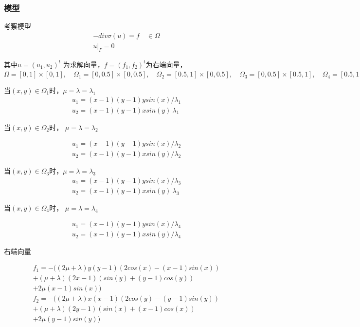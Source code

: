 \documentclass[a4paper,UTF8,titlepage]{ctexart}
\begin{document}
\subsubsection{模型}

考察模型
$$
\begin{matrix}
	-div \sigma(u) = f \quad \in \Omega  \\
	u |_{\Gamma} = 0
\end{matrix}
$$ 
\par
其中$ u = (u_1,u_2)^t $ 为求解向量，$ f = (f_1,f_2)^t $为右端向量，
$ 
\Omega = [0,1] \times [0,1] , \quad 
\Omega_1 = [0,0.5] \times [0,0.5] , \quad
\Omega_2 = [0.5,1] \times [0,0.5], \quad
\Omega_3 = [0,0.5] \times [0.5,1], \quad
\Omega_4 = [0.5,1] \times [0.5,1]
$ 
\par
当$(x,y) \in \Omega_1$时，$\mu = \lambda = \lambda_1$
$$
\begin{matrix}
	u_1 = (x - 1)(y - 1) y sin(x) / \lambda_1
	\\
	u_2 = (x - 1)(y - 1) x sin(y) \ \lambda_1
\end{matrix}
$$

当$(x,y) \in \Omega_2$时， $\mu = \lambda = \lambda_2$

$$
\begin{matrix}
	u_1 = (x - 1)(y - 1) y sin(x) / \lambda_2 
	\\
	u_2 = (x - 1)(y - 1) x sin(y) / \lambda_2
\end{matrix}
$$

当$(x,y) \in \Omega_3$时，$\mu = \lambda = \lambda_3$
$$
\begin{matrix}
	u_1 = (x - 1)(y - 1) y sin(x) / \lambda_3
	\\
	u_2 = (x - 1)(y - 1) x sin(y) \ \lambda_3
\end{matrix}
$$

当$(x,y) \in \Omega_4$时， $\mu = \lambda = \lambda_4$

$$
\begin{matrix}
	u_1 = (x - 1)(y - 1) y sin(x) / \lambda_4 
	\\
	u_2 = (x - 1)(y - 1) x sin(y) / \lambda_4
\end{matrix}
$$

右端向量

$$
\begin{matrix}
	f_1 = -((2 \mu + \lambda) y (y - 1) (2 cos(x) - (x - 1) sin(x)) \\
	+ (\mu + \lambda) (2 x - 1) (sin(y) + (y - 1) cos(y)) \\
	+ 2 \mu (x - 1) sin(x)) 
	\\
	f_2 = -((2 \mu + \lambda) x (x - 1) (2 cos(y) - (y - 1) sin(y)) \\
	+ (\mu + \lambda) (2 y - 1) (sin(x) + (x - 1) cos(x)) \\ 
	+ 2 \mu (y - 1) sin(y))
\end{matrix}
$$
\end{document}
